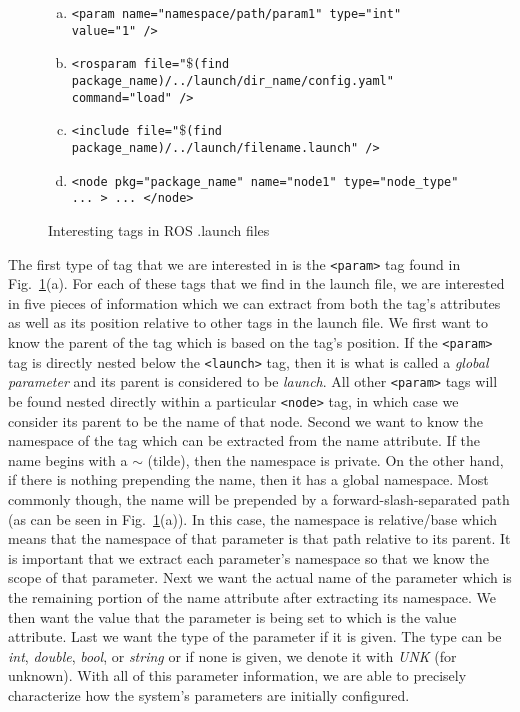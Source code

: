 \begin{figure}
	\begin{enumerate}[(a)]
		\item \texttt{<param name="namespace/path/param1" type="int" value="1" />}
		\item \texttt{<rosparam file="$\$$(find package\_name)/../launch/dir\_name/config.yaml" command="load" />}
		\item \texttt{<include file="$\$$(find package\_name)/../launch/filename.launch" />}
		\item \texttt{<node pkg="package\_name" name="node1" type="node\_type" ... > ... </node>}
	\end{enumerate}
	\caption{Interesting tags in ROS .launch files}
	\label{fig:launchtags}
\end{figure}

The first type of tag that we are interested in is the \texttt{<param>} tag found in Fig.~\ref{fig:launchtags}(a). For each of these tags that we find in the launch file, we are interested in five pieces of information which we can extract from both the tag's attributes as well as its position relative to other tags in the launch file. We first want to know the parent of the tag which is based on the tag's position. If the \texttt{<param>} tag is directly nested below the \texttt{<launch>} tag, then it is what is called a \emph{global parameter} and its parent is considered to be \emph{launch}. All other \texttt{<param>} tags will be found nested directly within a particular \texttt{<node>} tag, in which case we consider its parent to be the name of that node. Second we want to know the namespace of the tag which can be extracted from the name attribute. If the name begins with a $\sim$ (tilde), then the namespace is private. On the other hand, if there is nothing prepending the name, then it has a global namespace. Most commonly though, the name will be prepended by a forward-slash-separated path (as can be seen in Fig.~\ref{fig:launchtags}(a)). In this case, the namespace is relative/base which means that the namespace of that parameter is that path relative to its parent. It is important that we extract each parameter's namespace so that we know the scope of that parameter. Next we want the actual name of the parameter which is the remaining portion of the name attribute after extracting its namespace. We then want the value that the parameter is being set to which is the value attribute. Last we want the type of the parameter if it is given. The type can be \emph{int}, \emph{double}, \emph{bool}, or \emph{string} or if none is given, we denote it with \emph{UNK} (for unknown). With all of this parameter information, we are able to precisely characterize how the system's parameters are initially configured.

